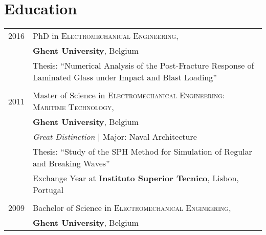 \documentclass[a4paper,10pt]{article} %
\begin{document}

\section{Education}

\begin{tabular}{rp{13cm}}	

 2016 & PhD in \textsc{Electromechanical Engineering},\\
& \textbf{Ghent University}, Belgium\\
& \small{Thesis: ``Numerical Analysis of the Post-Fracture Response of Laminated Glass under Impact and Blast Loading''}
\\
&\\


 2011 & Master of Science in \textsc{Electromechanical Engineering: Maritime Technology},\\
& \textbf{Ghent University}, Belgium\\
& \small\emph{Great Distinction} | Major: Naval Architecture\\
& \small{Thesis: ``Study of the SPH Method for Simulation of Regular and Breaking Waves''}\\ 
& \small{Exchange Year at \textbf{Instituto Superior Tecnico}, Lisbon, Portugal}\\
&\\


 2009 & Bachelor of Science in \textsc{Electromechanical Engineering},\\
& \textbf{Ghent University}, Belgium
\\



\end{tabular}

\end{document}
